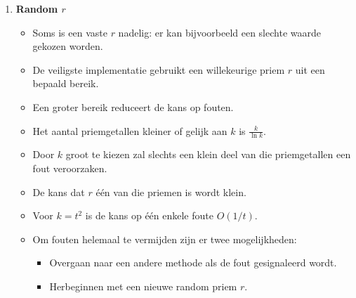 \begin{itemize}
\begin{itemize}
\begin{enumerate}
            \item \textbf{Random $r$}
            \begin{itemize}
                \item Soms is een vaste $r$ nadelig: er kan bijvoorbeeld een slechte waarde gekozen worden.
                \item De veiligste implementatie gebruikt een willekeurige priem $r$ uit een bepaald bereik.
                \item Een groter bereik reduceert de kans op fouten.
                \item Het aantal priemgetallen kleiner of gelijk aan $k$ is $\frac{k}{\ln k}$.
                \item Door $k$ groot te kiezen zal slechts een klein deel van die priemgetallen een fout veroorzaken.
                \item De kans dat $r$ één van die priemen is wordt klein.
                \item Voor $k = t^2$ is de kans op één enkele foute $O(1/t)$.
                \item Om fouten helemaal te vermijden zijn er twee mogelijkheden:
                \begin{itemize}
                    \item Overgaan naar een andere methode als de fout gesignaleerd wordt.
                    \item Herbeginnen met een nieuwe random priem $r$.
                \end{itemize}
            \end{itemize}
        \end{enumerate}

    \end{itemize}

\end{itemize}


